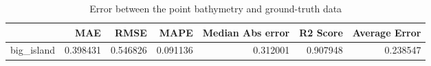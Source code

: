 \begin{table}[h!]
\caption{Error between the point bathymetry and ground-truth data}
\label{tab:big_island_lidar_error}
\begin{tabular}{lrrrrrr}
\toprule
 & MAE & RMSE & MAPE & Median Abs error & R2 Score & Average Error \\
\midrule
big_island & 0.398431 & 0.546826 & 0.091136 & 0.312001 & 0.907948 & 0.238547 \\
\bottomrule
\end{tabular}
\end{table}

